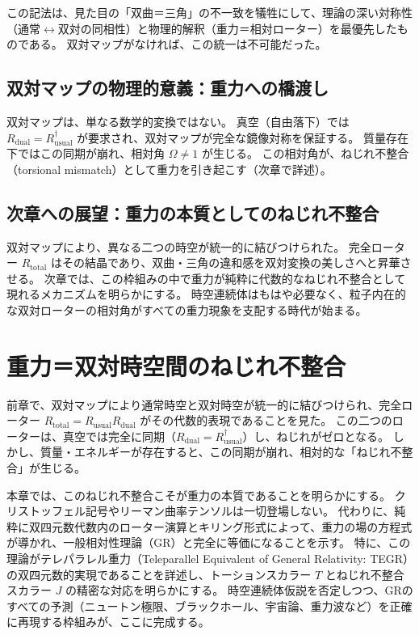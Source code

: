 \documentclass[dvipdfmx,a4paper]{jsbook}
\theoremstyle{definition}
\theoremstyle{remark}
\begin{document}
この記法は、見た目の「双曲＝三角」の不一致を犠牲にして、理論の深い対称性（通常$ \leftrightarrow $双対の同相性）と物理的解釈（重力＝相対ローター）を最優先したものである。
双対マップがなければ、この統一は不可能だった。

\section{双対マップの物理的意義：重力への橋渡し}
\label{sec:dual-map-gravity}

双対マップは、単なる数学的変換ではない。  
真空（自由落下）では $R_\text{dual} = R_\text{usual}^\dagger$ が要求され、双対マップが完全な鏡像対称を保証する。  
質量存在下ではこの同期が崩れ、相対角 $\Omega \neq 1$ が生じる。  
この相対角が、ねじれ不整合（torsional mismatch）として重力を引き起こす（次章で詳述）。

\section{次章への展望：重力の本質としてのねじれ不整合}
\label{sec:to-torsion}

双対マップにより、異なる二つの時空が統一的に結びつけられた。  
完全ローター $R_\text{total}$ はその結晶であり、双曲・三角の違和感を双対変換の美しさへと昇華させる。  
次章では、この枠組みの中で重力が純粋に代数的なねじれ不整合として現れるメカニズムを明らかにする。  
時空連続体はもはや必要なく、粒子内在的な双対ローターの相対角がすべての重力現象を支配する時代が始まる。

\chapter{重力＝双対時空間のねじれ不整合}
\label{chap:gravity-as-torsional-mismatch}

前章で、双対マップにより通常時空と双対時空が統一的に結びつけられ、完全ローター $R_\text{total} = R_\text{usual} R_\text{dual}$ がその代数的表現であることを見た。  
この二つのローターは、真空では完全に同期（$R_\text{dual} = R_\text{usual}^\dagger$）し、ねじれがゼロとなる。  
しかし、質量・エネルギーが存在すると、この同期が崩れ、相対的な「ねじれ不整合」が生じる。  

本章では、このねじれ不整合こそが重力の本質であることを明らかにする。  
クリストッフェル記号やリーマン曲率テンソルは一切登場しない。  
代わりに、純粋に双四元数代数内のローター演算とキリング形式によって、重力の場の方程式が導かれ、一般相対性理論（GR）と完全に等価になることを示す。  
特に、この理論がテレパラレル重力（Teleparallel Equivalent of General Relativity: TEGR）の双四元数的実現であることを詳述し、トーションスカラー $T$ とねじれ不整合スカラー $J$ の精密な対応を明らかにする。  
時空連続体仮説を否定しつつ、GRのすべての予測（ニュートン極限、ブラックホール、宇宙論、重力波など）を正確に再現する枠組みが、ここに完成する。
\end{document}
